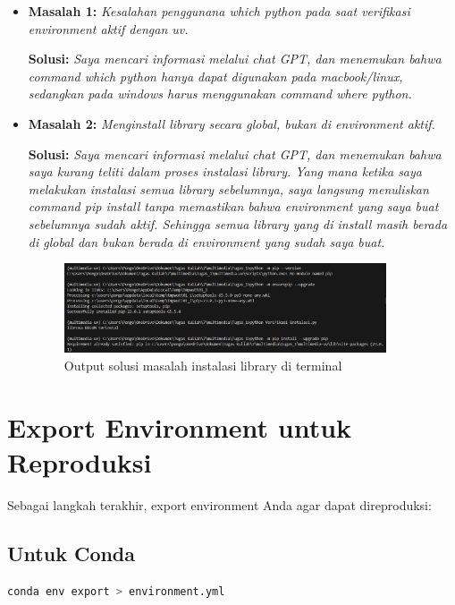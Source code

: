 \documentclass[11pt,a4paper]{article}
\begin{document}
\begin{itemize}
    \item \textbf{Masalah 1:} \textit{Kesalahan penggunana which python pada saat verifikasi environment aktif dengan uv.}
    
    \textbf{Solusi:} \textit{Saya mencari informasi melalui chat GPT, dan menemukan bahwa command which python hanya dapat digunakan pada macbook/linux, sedangkan pada windows harus menggunakan command where python.}
    
    \item \textbf{Masalah 2:} \textit{Menginstall library secara global, bukan di environment aktif.}
    
    \textbf{Solusi:} \textit{Saya mencari informasi melalui chat GPT, dan menemukan bahwa saya kurang teliti dalam proses instalasi library. Yang mana ketika saya melakukan instalasi semua library sebelumnya, saya langsung menuliskan command pip install tanpa memastikan bahwa environment yang saya buat sebelumnya sudah aktif. Sehingga semua library yang di install masih berada di global dan bukan berada di environment yang sudah saya buat.}
    \begin{figure}[h!]
        \centering
        \includegraphics[width=0.9\textwidth]{Figure/solusi.png}
        \caption{Output solusi masalah instalasi library di terminal}
        \label{fig:solusi masalah install library}
    \end{figure}
\end{itemize}

\section{Export Environment untuk Reproduksi}
Sebagai langkah terakhir, export environment Anda agar dapat direproduksi:

\subsection{Untuk Conda}
\begin{lstlisting}[language=bash, caption=Export conda environment]
conda env export > environment.yml
\end{lstlisting}
\end{document}
